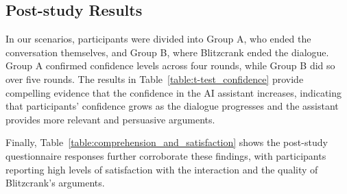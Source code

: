 \subsection{Post-study Results}
In our scenarios, participants were divided into Group A, who ended the conversation themselves, and Group B, where Blitzcrank ended the dialogue. Group A confirmed confidence levels across four rounds, while Group B did so over five rounds. The results in Table~\ref{table:t-test_confidence} provide compelling evidence that the confidence in the AI assistant increases, indicating that participants' confidence grows as the dialogue progresses and the assistant provides more relevant and persuasive arguments.

Finally, Table~\ref{table:comprehension_and_satisfaction} shows the post-study questionnaire responses further corroborate these findings, with participants reporting high levels of satisfaction with the interaction and the quality of Blitzcrank's arguments.

